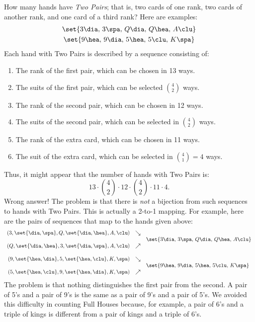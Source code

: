 How many hands have \emph{Two Pairs}; that is, two cards of one
rank, two cards of another rank, and one card of a third rank?
Here are examples:
%
\begin{gather*}
\set{ 3 \dia, \, 3 \spa, \, Q \dia, \, Q \hea, \, A \clu } \\
\set{ 9 \hea, \, 9 \dia, \, 5 \hea, \, 5 \clu, \, K \spa }
\end{gather*}
%
Each hand with Two Pairs is described by a sequence consisting of:
%
\begin{enumerate}
\item The rank of the first pair, which can be chosen in 13 ways.
\item The suits of the first pair, which can be selected $\binom{4}{2}$ ways.
\item The rank of the second pair, which can be chosen in 12 ways.
\item The suits of the second pair, which can be selected in $\binom{4}{2}$ ways.
\item The rank of the extra card, which can be chosen in 11 ways.
\item The suit of the extra card, which can be selected in $\binom{4}{1} = 4$ ways.
\end{enumerate}
%
Thus, it might appear that the number of hands with Two Pairs is:
%
\[
    13 \cdot \binom{4}{2} \cdot 12 \cdot \binom{4}{2} \cdot 11 \cdot 4.
\]
%
Wrong answer!  The problem is that there is \emph{not} a bijection
from such sequences to hands with Two Pairs.  This is actually a
2-to-1 mapping.  For example, here are the pairs of sequences that map
to the hands given above:
%
\[
\begin{array}{rcl}
(3, \set{\dia, \spa}, Q, \set{\dia, \hea}, A, \clu) & \searrow \\
 & & \set{ 3 \dia, \, 3 \spa, \, Q \dia, \, Q \hea, \, A \clu } \\
(Q, \set{\dia, \hea}, 3, \set{\dia, \spa}, A, \clu) & \nearrow \\
\\
(9, \set{\hea, \dia}, 5, \set{\hea, \clu}, K, \spa) & \searrow \\
& & \set{ 9 \hea, \, 9 \dia, \, 5 \hea, \, 5 \clu, \, K \spa } \\
(5, \set{\hea, \clu}, 9, \set{\hea, \dia}, K, \spa) & \nearrow \\
\end{array}
\]
%
The problem is that nothing distinguishes the first pair from the
second.  A pair of 5's and a pair of 9's is the same as a pair of 9's
and a pair of 5's.  We avoided this difficulty in counting Full Houses
because, for example, a pair of 6's and a triple of kings is different
from a pair of kings and a triple of 6's.

